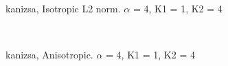\begin{figure}
  \centering
     \\
  \caption{kanizsa, Isotropic L2 norm. $\alpha$ = 4, K1 = 1, K2 = 4}
  \label{fig:kanizsa_L2_a4_k11_k24}
\end{figure}

\begin{figure}
  \centering
     \\
  \caption{kanizsa, Anisotropic. $\alpha$ = 4, K1 = 1, K2 = 4}
  \label{fig:kanizsa_ANISO_a4_k11_k24}
\end{figure}